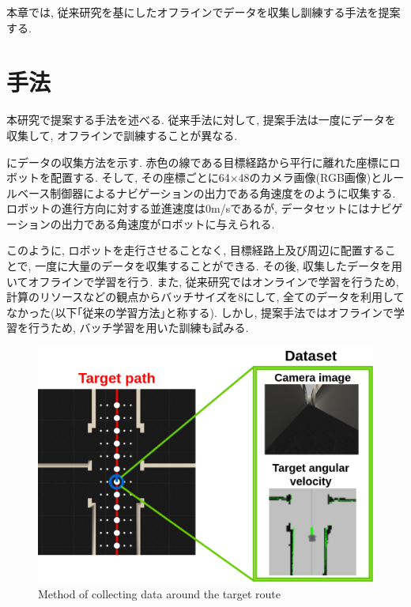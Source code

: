 
本章では, 従来研究を基にしたオフラインでデータを収集し訓練する手法を提案する.

\section{手法}
本研究で提案する手法を述べる. 従来手法に対して, 提案手法は一度にデータを収集して, オフラインで訓練することが異なる. 
\par {}にデータの収集方法を示す. 赤色の線である目標経路から平行に離れた座標にロボットを配置する. そして, その座標ごとに64×48のカメラ画像(RGB画像)とルールベース制御器によるナビゲーションの出力である角速度をのように収集する. ロボットの進行方向に対する並進速度は0m/sであるが, データセットにはナビゲーションの出力である角速度がロボットに与えられる. \par このように, ロボットを走行させることなく, 目標経路上及び周辺に配置することで, 一度に大量のデータを収集することができる. その後, 収集したデータを用いてオフラインで学習を行う. また, 従来研究ではオンラインで学習を行うため, 計算のリソースなどの観点からバッチサイズを8にして, 全てのデータを利用してなかった(以下｢従来の学習方法｣と称する). しかし, 提案手法ではオフラインで学習を行うため, バッチ学習を用いた訓練も試みる. 

\newpage
  \begin{figure}[h]
  \centering
  \includegraphics[keepaspectratio, scale=0.25]{images/collect-data2.png}
  \caption{Method of collecting data around the target route}
  \label{Fig:collect-data2}
  \end{figure}

